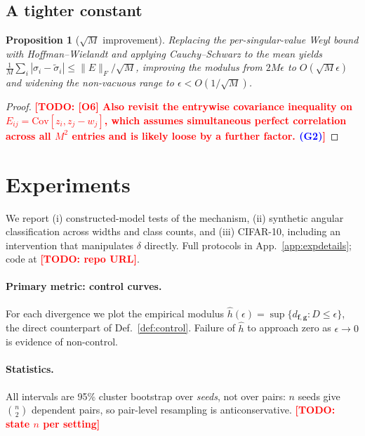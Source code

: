 \documentclass{article}
\newcommand{\TODO}[1]{\textcolor{red}{\textbf{[TODO: #1]}}}
\newcommand{\GATE}[1]{\textcolor{blue}{\textsf{\small (#1)}}}
\newcommand{\bff}{\mathbf{f}}
\newcommand{\bfg}{\mathbf{g}}
\newcommand{\dfg}{d_{\bff,\bfg}}
\newcommand{\Cov}{\mathrm{Cov}}
\theoremstyle{plain}
\newtheorem{proposition}[theorem]{Proposition}
\theoremstyle{definition}
\theoremstyle{remark}
\begin{document}
\subsection{A tighter constant}
\label{sec:tighten}

\begin{proposition}[$\sqrt{M}$ improvement]
\label{prop:tighten}
Replacing the per-singular-value Weyl bound with Hoffman--Wielandt and applying
Cauchy--Schwarz to the mean yields
$\tfrac1M\sum_{i}|\sigma_{i}-\tilde\sigma_{i}|\le\|E\|_{F}/\sqrt{M}$, improving
the modulus from $2M\epsilon$ to $O(\sqrt{M}\epsilon)$ and widening the
non-vacuous range to $\epsilon<O(1/\sqrt{M})$.
\end{proposition}
\begin{proof}
\TODO{[O6] Also revisit the entrywise covariance inequality on
$E_{ij}=\Cov[z_{i},z_{j}-w_{j}]$, which assumes simultaneous perfect
correlation across all $M^{2}$ entries and is likely loose by a further factor.
\GATE{G2}}
\end{proof}

\section{Experiments}
\label{sec:experiments}

We report (i) constructed-model tests of the mechanism, (ii) synthetic angular
classification across widths and class counts, and (iii) CIFAR-10, including an
intervention that manipulates $\delta$ directly. Full protocols in
App.~\ref{app:expdetails}; code at \TODO{repo URL}.

\paragraph{Primary metric: control curves.}
For each divergence we plot the empirical modulus
$\hat h(\epsilon)=\sup\{\dfg : D\le\epsilon\}$, the direct counterpart of
Def.~\ref{def:control}. Failure of $\hat h$ to approach zero as
$\epsilon\to0$ is evidence of non-control.

\paragraph{Statistics.}
All intervals are 95\% cluster bootstrap over \emph{seeds}, not over pairs:
$n$ seeds give $\binom{n}{2}$ dependent pairs, so pair-level resampling is
anticonservative. \TODO{state $n$ per setting}
\end{document}
